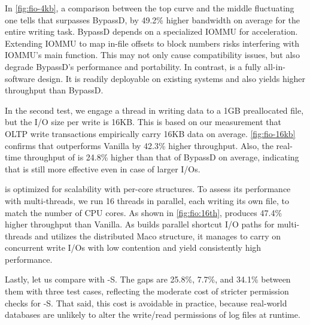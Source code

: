 In \autoref{fig:fio-4kb}, a comparison between the top curve and the middle fluctuating one tells that
\odes surpasses BypassD, by 49.2\% higher bandwidth on average for the entire writing task.
BypassD depends on a specialized  IOMMU for acceleration.
  Extending IOMMU to map in-file offsets to   block numbers risks interfering with IOMMU's main function.
  This may not only cause compatibility issues, but also degrade BypassD's performance and %
  portability. In contrast, \odes is a fully all-in-software design. It is readily deployable on existing systems
  and also yields higher throughput than BypassD.

In the second   test, we   engage a   thread in writing data to a 1GB preallocated file, but the I/O size per write  is  16KB. This is based on our measurement that
OLTP write transactions %
  empirically carry  16KB data on average. 
\autoref{fig:fio-16kb}  confirms that \odes outperforms Vanilla
by  {42.3\%} higher throughput.
Also, the real-time throughput of \odes is 24.8\% higher than that of BypassD on average, indicating that \odes is still more effective even
in case of larger   I/Os.

\odes is optimized for scalability with per-core structures.
To assess its performance with multi-threads, we run 16 threads in parallel, each writing its own file, to match the number of CPU cores. As shown in \autoref{fig:fio:16th}, \odes produces  {47.4\%} higher throughput than Vanilla. 
As \odes builds parallel shortcut I/O paths for multi-threads and utilizes the distributed Maco structure, it manages to carry on concurrent write I/Os with low contention and  yield consistently high performance.


Lastly, let us compare \odes with \odes-S. %
The gaps are
 {25.8\%}, 7.7\%, and 34.1\%   between them with three test cases, reflecting 
   the moderate cost of stricter permission checks for \odes-S.
That said,
this cost is avoidable in practice, because real-world databases are   unlikely to alter the write/read permissions of log files at runtime.

